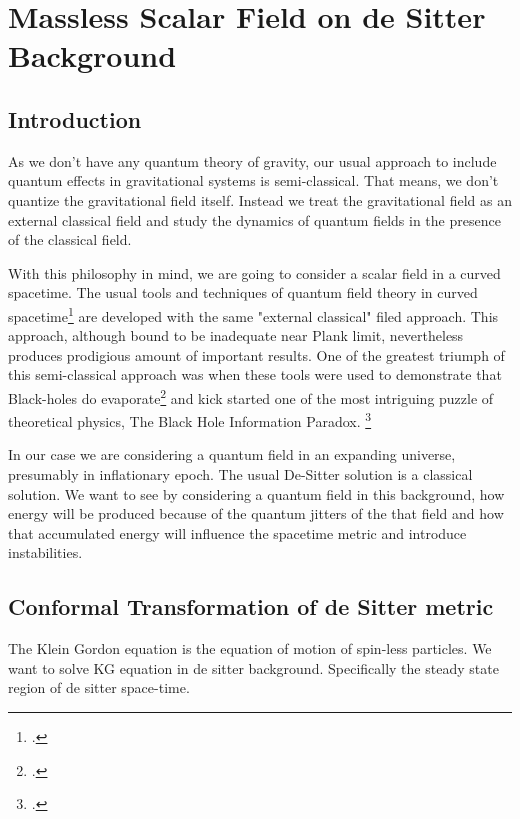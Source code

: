 \chapter{Massless Scalar Field on de Sitter Background}


\section{Introduction}

As we don't have any quantum theory of gravity, our usual approach to include quantum effects in gravitational systems is semi-classical. That means, we don't quantize the gravitational field itself. Instead we treat the gravitational field as an external classical field and study the dynamics of quantum fields in the presence of the classical field. \par

With this philosophy in mind, we are going to consider a scalar field in a curved spacetime. The usual tools and techniques of quantum field theory in curved spacetime\footcite[For a modern review See][]{holland:2014} are developed with the same "external classical" filed approach. This approach, although bound to be inadequate near Plank limit, nevertheless produces prodigious amount of important results. One of the greatest triumph of this semi-classical approach was when these tools were used to demonstrate that Black-holes do evaporate\footcite[][]{hawking:1974} and kick started one of the most intriguing puzzle of theoretical physics, The Black Hole Information Paradox. \footcite{hawking:1975}

In our case we are considering a quantum field in an expanding universe, presumably in inflationary epoch. The usual De-Sitter solution is a classical solution. We want to see by considering a quantum field in this background, how energy will be produced because of the quantum jitters of the that field and how that accumulated energy will influence the spacetime metric and introduce instabilities.

\section{Conformal Transformation of de Sitter metric}

The Klein Gordon equation is the equation of motion of spin-less particles. We want to solve KG equation in de sitter background. Specifically the steady state region of de sitter space-time. \par

